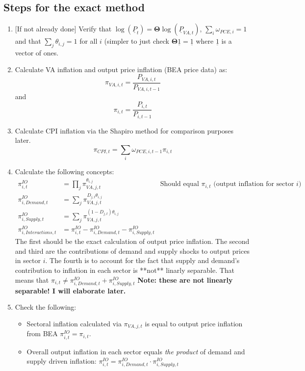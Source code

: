 \documentclass[12pt,english]{article}
\begin{document}
\subsection{Steps for the exact method}
\begin{enumerate}
	\item {[If not already done]} Verify that $\log(\underline{P}_t) = \mathbold{\Theta} \log(\underline{P}_{VA,t})$, $\sum_i \omega_{PCE,i}=1$ and that $\sum_j \theta_{i,j}=1$ for all $i$ (simpler to just check $\mathbold{\Theta}\underline{1} = \underline{1}$ where $\underline{1}$ is a vector of ones.
	\item Calculate VA inflation and output price inflation (BEA price data) as:
	\[
		\pi_{VA,i,t} = \frac{P_{VA,i,t}}{P_{VA,i,t-1}}	
	\]
		and 
	\[
		\pi_{i,t} = \frac{P_{i,t}}{P_{i,t-1}}	
	\]	
	\item Calculate CPI inflation via the Shapiro method for comparison purposes later.
	\[
		\pi_{CPI,t} =  \sum_i \omega_{PCE,i,t-1} \pi_{i,t}
	\]
	\item Calculate the following concepts:
	\begin{align*}
		\pi_{i,t}^{IO} &= \prod_j \pi_{VA,j,t}^{\theta_{i,j}} & \text{Should equal }\pi_{i,t}\text{ (output inflation for sector }i\text{)}\\
		\pi_{i,Demand,t}^{IO} &= \sum_j \pi_{VA,j,t}^{D_{j,t}\theta_{i,j}}\\
		\pi_{i,Supply,t}^{IO} &= \sum_j \pi_{VA,j,t}^{(1-D_{j,t})\theta_{i,j}}\\
		\pi_{i,Interactions,t}^{IO} &= \pi_{i,t}^{IO} - \pi_{i,Demand,t}^{IO} - \pi_{i,Supply,t}^{IO}
	\end{align*}	
	The first should be the exact calculation of output price inflation. The second and third are the contributions of demand and supply shocks to output prices in sector $i$. The fourth is to account for the fact that supply and demand's contribution to inflation in each sector is **not** linarly separable. That means that $\pi_{i,t} \neq \pi_{i,Demand,t}^{IO} + \pi_{i,Supply,t}^{IO}$ 
	{\bf Note: these are not linearly separable! I will elaborate later.}
	\item Check the following:
	\begin{itemize}
		\item Sectoral inflation calculated via $\pi_{VA,j,t}$ is equal to output price inflation from BEA $\pi_{i,t}^{IO} = \pi_{i,t}$.
		\item Overall output inflation in each sector equals \emph{the product} of demand and supply driven inflation: $\pi_{i,t}^{IO} = \pi_{i,Demand,t}^{IO}\cdot \pi_{i,Supply,t}^{IO}$

\end{itemize}
\end{enumerate}
\end{document}
